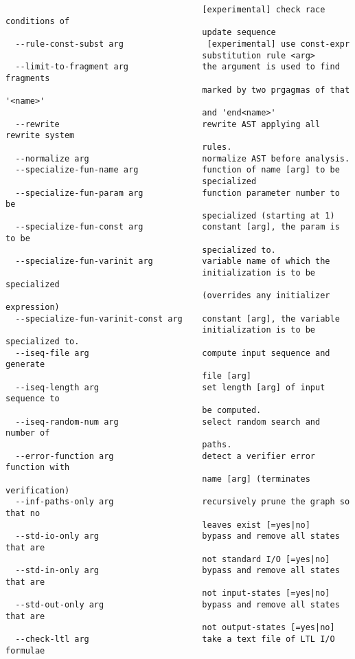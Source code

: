 \documentclass[natbib]{article}
\begin{document}
\begin{verbatim}
                                        [experimental] check race conditions of
                                        update sequence
  --rule-const-subst arg                 [experimental] use const-expr 
                                        substitution rule <arg>
  --limit-to-fragment arg               the argument is used to find fragments 
                                        marked by two prgagmas of that '<name>'
                                        and 'end<name>'
  --rewrite                             rewrite AST applying all rewrite system
                                        rules.
  --normalize arg                       normalize AST before analysis.
  --specialize-fun-name arg             function of name [arg] to be 
                                        specialized
  --specialize-fun-param arg            function parameter number to be 
                                        specialized (starting at 1)
  --specialize-fun-const arg            constant [arg], the param is to be 
                                        specialized to.
  --specialize-fun-varinit arg          variable name of which the 
                                        initialization is to be specialized 
                                        (overrides any initializer expression)
  --specialize-fun-varinit-const arg    constant [arg], the variable 
                                        initialization is to be specialized to.
  --iseq-file arg                       compute input sequence and generate 
                                        file [arg]
  --iseq-length arg                     set length [arg] of input sequence to 
                                        be computed.
  --iseq-random-num arg                 select random search and number of 
                                        paths.
  --error-function arg                  detect a verifier error function with 
                                        name [arg] (terminates verification)
  --inf-paths-only arg                  recursively prune the graph so that no 
                                        leaves exist [=yes|no]
  --std-io-only arg                     bypass and remove all states that are 
                                        not standard I/O [=yes|no]
  --std-in-only arg                     bypass and remove all states that are 
                                        not input-states [=yes|no]
  --std-out-only arg                    bypass and remove all states that are 
                                        not output-states [=yes|no]
  --check-ltl arg                       take a text file of LTL I/O formulae 

\end{verbatim}
\end{document}
